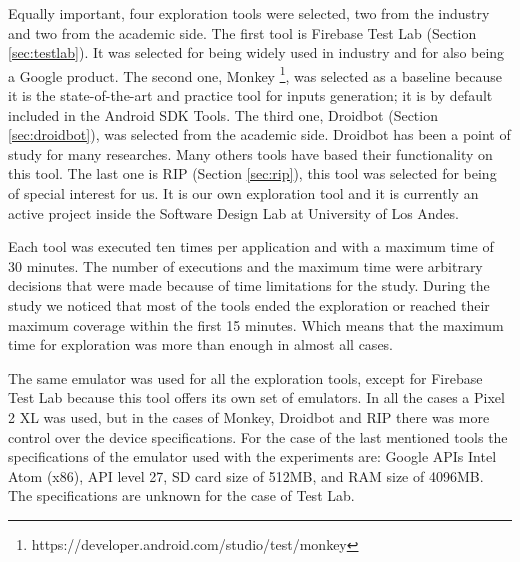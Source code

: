 Equally important, four exploration tools were selected, two from the industry and two from the academic side. The first tool is Firebase Test Lab (Section \ref{sec:testlab}). It was selected for being widely used in industry and for also being a Google product. The second one, Monkey \footnote{https://developer.android.com/studio/test/monkey}, was selected as a baseline because it is the state-of-the-art and practice tool for inputs generation; it is by default included in the Android SDK Tools. The third one, Droidbot (Section \ref{sec:droidbot}), was selected from the academic side. Droidbot has been a point of study for many researches. Many others tools have based their functionality on this tool. The last one is RIP (Section \ref{sec:rip}), this tool was selected for being of special interest for us. It is our own exploration tool and it is currently an active project inside the Software Design Lab at University of Los Andes. 

Each tool was executed ten times per application and with a maximum time of 30 minutes. The number of executions and the maximum time were arbitrary decisions that were made because of time limitations for the study. During the study we noticed that most of the tools ended the exploration or reached their maximum coverage within the first 15 minutes. Which means that the maximum time for exploration was more than enough in almost all cases. 

The same emulator was used for all the exploration tools, except for Firebase Test Lab because this tool offers its own set of emulators. In all the cases a Pixel 2 XL was used, but in the cases of Monkey, Droidbot and RIP there was more control over the device specifications. For the case of the last mentioned tools the specifications of the emulator used with the experiments are:  Google APIs Intel Atom (x86), API level 27, SD card size of 512MB, and RAM size of 4096MB. The specifications are unknown for the case of Test Lab.

